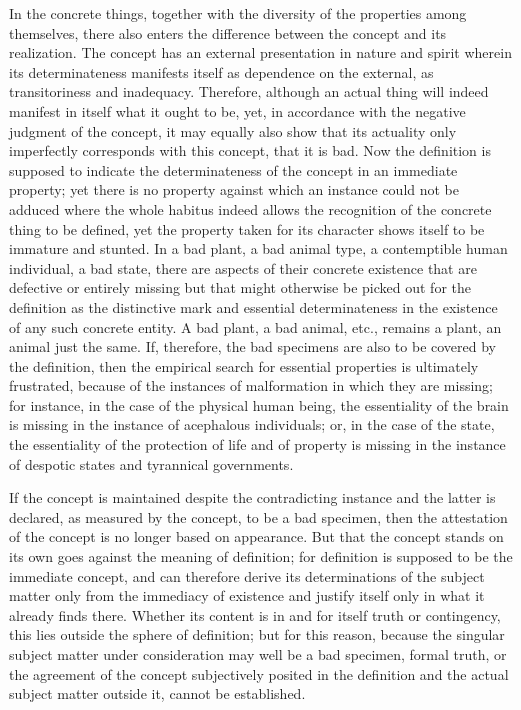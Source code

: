 In the concrete things, together with
the diversity of the properties among themselves,
there also enters the difference between
the concept and its realization.
The concept has an external presentation
in nature and spirit
wherein its determinateness manifests itself
as dependence on the external,
as transitoriness and inadequacy.
Therefore, although an actual thing
will indeed manifest in itself
what it ought to be, yet,
in accordance with the negative judgment of the concept,
it may equally also show that its actuality
only imperfectly corresponds with this concept,
that it is bad.
Now the definition is supposed to
indicate the determinateness of
the concept in an immediate property;
yet there is no property against which
an instance could not be adduced
where the whole habitus indeed allows
the recognition of the concrete thing to be defined,
yet the property taken for its character shows itself
to be immature and stunted.
In a bad plant, a bad animal type,
a contemptible human individual, a bad state,
there are aspects of their concrete existence
that are defective or entirely missing
but that might otherwise be picked out
for the definition as the distinctive mark
and essential determinateness
in the existence of any such concrete entity.
A bad plant, a bad animal, etc., remains a plant,
an animal just the same.
If, therefore, the bad specimens are
also to be covered by the definition,
then the empirical search for essential properties is
ultimately frustrated,
because of the instances of malformation
in which they are missing;
for instance, in the case of the physical human being,
the essentiality of the brain is missing
in the instance of acephalous individuals;
or, in the case of the state, the essentiality of
the protection of life and of property is
missing in the instance of despotic states
and tyrannical governments.

If the concept is maintained despite
the contradicting instance
and the latter is declared,
as measured by the concept,
to be a bad specimen,
then the attestation of the concept is
no longer based on appearance.
But that the concept stands on its own
goes against the meaning of definition;
for definition is supposed to be the immediate concept,
and can therefore derive its determinations of
the subject matter only from the immediacy of existence
and justify itself only in what it already finds there.
Whether its content is in and for itself truth or contingency,
this lies outside the sphere of definition;
but for this reason, because the singular
subject matter under consideration
may well be a bad specimen,
formal truth, or the agreement of the concept
subjectively posited in the definition
and the actual subject matter outside it,
cannot be established.

